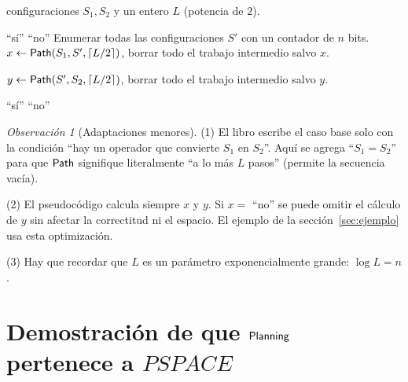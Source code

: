 \documentclass[11pt,letterpaper]{article}
\newcommand{\portadasf}{\fontencoding{T1}\fontfamily{lmss}\selectfont}
\DeclareRobustCommand{\nombreMatTitulo}[1]{%
  \mbox{\fontencoding{OT1}\fontfamily{cmss}\upshape\selectfont
        \MakeUppercase{#1}}}
\newcommand{\tituloseccion}[1]{%
  \begingroup
  \renewcommand{\nombreMat}[1]{\nombreMatTitulo{##1}}%
  \textls[120]{\MakeUppercase{#1}}%
  \endgroup}
\newcommand{\etiquetacaja}[1]{{\portadasf\bfseries\color{ink}#1}}
\theoremstyle{plain}
\theoremstyle{definition}
\theoremstyle{remark}
\newtheorem{observacion}[teorema]{Observación}
\newcommand{\nombreMat}[1]{\ensuremath{\text{\fontencoding{OT1}\fontfamily{cmss}\upshape\selectfont #1}}}
\newcommand{\PSPACE}{\nombreMat{PSPACE}}
\newcommand{\NP}{\nombreMat{NP}}
\newcommand{\coNP}{\nombreMat{co-NP}}
\newcommand{\PLANNING}{\nombreMat{Planning}}
\newcommand{\Path}{\nombreMat{Path}}
\def\PSPACE{PSPACE}\def\NP{NP}\def\coNP{co-NP}%
\begin{document}
\begin{tcolorbox}[
caja portada,
title={\tituloseccion{Procedimiento $\Path(S_1,S_2,L)$}
\hfill{\mdseries(Kleinberg \& Tardos, 2005, p.~542)}}
]
\begin{algorithmic}[1]
\Statex \etiquetacaja{Entrada:} configuraciones $S_1,S_2$
y un entero $L$ (potencia de $2$).

        \State \Return ``sí''
    \Else
        \State \Return ``no''
    \EndIf
\Else
    \State Enumerar todas las configuraciones
    $S'$ con un contador de $n$ bits.
        \State $x \gets
        \Path(S_1,S',\lceil L/2\rceil)$,
        borrar todo el trabajo intermedio salvo $x$.

        \State $y \gets
        \Path(S',S_2,\lceil L/2\rceil)$,
        borrar todo el trabajo intermedio salvo $y$.

            \State \Return ``sí''
        \EndIf
    \EndFor
    \State \Return ``no''
\EndIf
\end{algorithmic}
\end{tcolorbox}

\begin{observacion}[Adaptaciones menores]
(1) El libro escribe el caso base solo con la condición
``hay un operador que convierte $S_1$ en $S_2$''.
Aquí se agrega ``$S_1=S_2$'' para que $\Path$
signifique literalmente ``a lo más $L$ pasos''
(permite la secuencia vacía).

(2) El pseudocódigo calcula siempre $x$ y $y$.
Si $x=$ ``no'' se puede omitir el cálculo de $y$
sin afectar la correctitud ni el espacio.
El ejemplo de la sección~\ref{sec:ejemplo}
usa esta optimización.

(3) Hay que recordar que $L$ es un parámetro
exponencialmente grande: $\log L=n$.
\end{observacion}



\newpage
\section{Demostración de que \PLANNING{} pertenece a $\PSPACE$}
\end{document}
